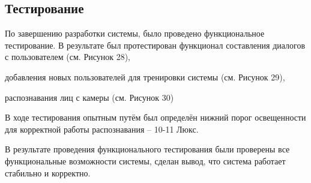 \subsection{Тестирование}

По завершению разработки системы, было проведено функциональное тестирование.
В результате был протестирован функционал составления диалогов с пользователем
(см. Рисунок 28),


добавления новых пользователей для тренировки системы (см. Рисунок 29),


распознавания лиц с камеры (см. Рисунок 30)


В ходе тестирования опытным путём был определён нижний порог освещенности для
корректной работы распознавания -- 10-11 Люкс.

В результате проведения функционального тестирования были проверены все
функциональные возможности системы, сделан вывод, что система работает
стабильно и корректно.
